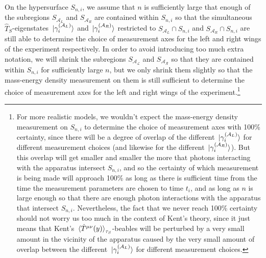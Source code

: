 On the hypersurface $S_{n,i}$, we assume that $n$ is sufficiently large that enough of the subregions $S_{\mathcal{A}_L}$ and $S_{\mathcal{A}_R}$ are contained within $S_{n,i}$ so that the simultaneous $\hat{T}_S$-eigenstates $\ket*{\gamma_i^{(\mathcal{A}_L)}}$ and $\ket*{\gamma_i^{(\mathcal{A}_R)}}$ restricted to $S_{\mathcal{A}_L}\cap S_{n,i}$ and $S_{\mathcal{A}_R}\cap S_{n,i}$ are still able to determine the choice of measurement axes for the left and right wings of the experiment respectively. In order to avoid introducing too much extra notation, we will shrink the subregions $S_{\mathcal{A_L}}$ and $S_{\mathcal{A_R}}$ so that they are contained within $S_{n,i}$ for sufficiently large $n$, but we only shrink them slightly so that the mass-energy density measurement on them is still sufficient to determine the choice of measurement axes for the left and right wings of the experiment.\footnote{For more realistic models, we wouldn't expect the mass-energy density measurement on $S_{n,i}$ to determine the choice of measurement axes with 100\% certainty, since there will be a degree of overlap of the different $\ket*{\gamma_i^{(\mathcal{A}_L)}}$ for different measurement choices (and likewise for the different $\ket*{\gamma_i^{(\mathcal{A}_R)}}$). But this overlap will get smaller and smaller the more that photons interacting with the apparatus intersect $S_{n,i}$, and so the certainty of which measurement is being made will approach 100\% as long as there is sufficient time from the time the measurement parameters are chosen to time $t_i$, and as long as $n$ is large enough so that there are enough photon interactions with the apparatus that intersect $S_{n,i}$. Nevertheless, the fact that we never reach 100\% certainty should not worry us too much in the context of Kent's theory, since it just means that Kent's $\ev*{\hat{T}^{\mu\nu}(y)}_{\tau_S}$-beables will be perturbed by a very small amount in the vicinity of the apparatus caused by the very small amount of overlap between the different $\ket*{\gamma_i^{(\mathcal{A}_L)}}$ for different measurement choices. }   

